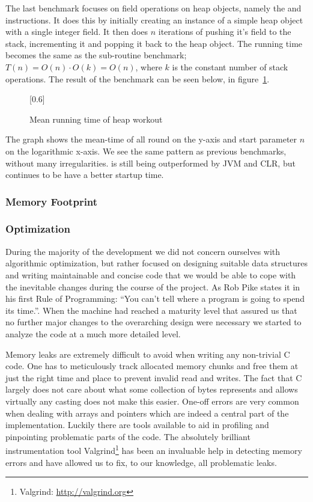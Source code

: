 
The last benchmark focuses on field operations on heap objects, namely the
 and  instructions. It does
this by initially creating an instance of a simple heap object with a single
integer field. It then does $n$ iterations of pushing it's field to the stack,
incrementing it and popping it back to the heap object. The running time becomes
the same as the sub-routine benchmark; $T(n) = O(n) \cdot O(k) = O(n)$, where
$k$ is the constant number of stack operations. The result of the
benchmark can be seen below, in figure~\ref{fig:eval:benchmark:heap}.
\begin{figure}[H]
  \centering
  \scalebox{0.8}[0.6]{}
  \caption{Mean running time of heap workout}
\label{fig:eval:benchmark:heap}
\end{figure}

The graph shows the mean-time of all round on the y-axis and start parameter $n$
on the logarithmic x-axis. We see the same pattern as previous benchmarks,
without many irregularities. \thename{} is still being outperformed by JVM and
CLR, but continues to be have a better startup time.


\subsubsection{Memory Footprint}

\subsubsection{Optimization}

During the majority of the development we did not concern ourselves with
algorithmic optimization, but rather focused on designing suitable data
structures and writing maintainable and concise code that we would be able to
cope with the inevitable changes during the course of the project. As Rob Pike
states it in his first Rule of Programming: ``You can't tell where a program is
going to spend its time.''\cite{pike-rules}. When the machine had reached a
maturity level that assured us that no further major changes to the overarching
design were necessary we started to analyze the code at a much more detailed
level.

Memory leaks are extremely difficult to avoid when writing any non-trivial C
code. One has to meticulously track allocated memory chunks and free them at
just the right time and place to prevent invalid read and writes. The fact that
C largely does not care about what some collection of bytes represents and
allows virtually any casting does not make this easier. One-off errors are very
common when dealing with arrays and pointers which are indeed a central part of
the \thename{} implementation. Luckily there are tools available to aid in
profiling and pinpointing problematic parts of the code. The absolutely
brilliant instrumentation tool Valgrind\footnote{Valgrind:
  \url{http://valgrind.org}} has been an invaluable help in detecting memory
errors and have allowed us to fix, to our knowledge, all problematic leaks.

